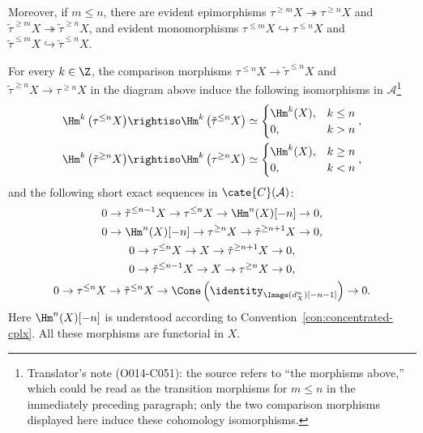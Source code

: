 Moreover, if $m \leq n$, there are evident epimorphisms
$\tau^{\geq m} X \twoheadrightarrow \tau^{\geq n} X$ and
$\tilde{\tau}^{\geq m} X \twoheadrightarrow \tilde{\tau}^{\geq n} X$,
and evident monomorphisms
$\tau^{\leq m} X \hookrightarrow \tau^{\leq n} X$ and
$\tilde{\tau}^{\leq m} X \hookrightarrow \tilde{\tau}^{\leq n} X$.

\begin{lemma}\label{prop:truncation-ses}
	For every $k \in \Z$, the comparison morphisms
	$\tau^{\leq n}X \to \tilde{\tau}^{\leq n}X$ and
	$\tilde{\tau}^{\geq n}X \to \tau^{\geq n}X$ in the diagram above
	induce the following isomorphisms in $\mathcal{A}$\footnote{Translator's
	note (O014-C051): the source refers to ``the morphisms above,'' which could
	be read as the transition morphisms for $m\leq n$ in the immediately
	preceding paragraph; only the two comparison morphisms displayed here
	induce these cohomology isomorphisms.}
	\begin{align*}
		\Hm^k\left( \tau^{\leq n} X\right) & \rightiso \Hm^k\left( \tilde{\tau}^{\leq n} X\right) \simeq \begin{cases} \Hm^k(X), & k \leq n \\ 0, & k > n \end{cases}, \\
		\Hm^k\left( \tilde{\tau}^{\geq n} X\right) & \rightiso \Hm^k\left( \tau^{\geq n} X\right) \simeq \begin{cases} \Hm^k(X), & k \geq n \\ 0, & k < n \end{cases},
	\end{align*}
	and the following short exact sequences in $\cate{C}(\mathcal{A})$:
	\begin{equation*}\begin{gathered}
		0 \to \tilde{\tau}^{\leq n-1} X \to \tau^{\leq n} X \to \Hm^n(X)[-n] \to 0, \\
		0 \to \Hm^n(X)[-n] \to \tau^{\geq n} X \to \tilde{\tau}^{\geq n+1} X \to 0, \\
		0 \to \tau^{\leq n} X \to X \to \tilde{\tau}^{\geq n+1} X \to 0, \\
		0 \to \tilde{\tau}^{\leq n-1} X \to X \to \tau^{\geq n} X \to 0, \\
		0 \to \tau^{\leq n} X \to \tilde{\tau}^{\leq n} X \to \Cone\left(\identity_{\Image(d_X^n) [-n-1]} \right) \to 0.
	\end{gathered}\end{equation*}
	Here $\Hm^n(X)[-n]$ is understood according to
	Convention~\ref{con:concentrated-cplx}. All these morphisms are functorial
	in $X$.
\end{lemma}
